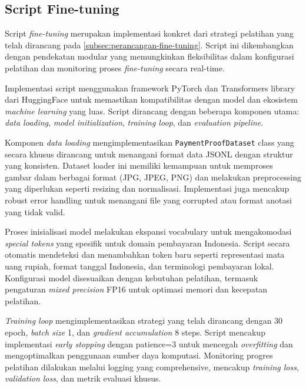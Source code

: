 \subsection{Script Fine-tuning}
\label{subsec:script-fine-tuning}

Script \emph{fine-tuning} merupakan implementasi konkret dari strategi pelatihan yang telah dirancang pada \autoref{subsec:perancangan-fine-tuning}. Script ini dikembangkan dengan pendekatan modular yang memungkinkan fleksibilitas dalam konfigurasi pelatihan dan monitoring proses \emph{fine-tuning} secara real-time.


Implementasi script menggunakan framework PyTorch dan Transformers library dari HuggingFace untuk memastikan kompatibilitas dengan model \donut{} dan ekosistem \emph{machine learning} yang luas. Script dirancang dengan beberapa komponen utama: \emph{data loading}, \emph{model initialization}, \emph{training loop}, dan \emph{evaluation pipeline}.

Komponen \emph{data loading} mengimplementasikan \texttt{PaymentProofDataset} class yang secara khusus dirancang untuk menangani format data JSONL dengan struktur yang konsisten. Dataset loader ini memiliki kemampuan untuk memproses gambar dalam berbagai format (JPG, JPEG, PNG) dan melakukan preprocessing yang diperlukan seperti resizing dan normalisasi. Implementasi juga mencakup robust error handling untuk menangani file yang corrupted atau format anotasi yang tidak valid.

Proses inisialisasi model melakukan ekspansi vocabulary untuk mengakomodasi \emph{special tokens} yang spesifik untuk domain pembayaran Indonesia. Script secara otomatis mendeteksi dan menambahkan token baru seperti representasi mata uang rupiah, format tanggal Indonesia, dan terminologi pembayaran lokal. Konfigurasi model disesuaikan dengan kebutuhan pelatihan, termasuk pengaturan \emph{mixed precision} FP16 untuk optimasi memori dan kecepatan pelatihan.

\emph{Training loop} mengimplementasikan strategi yang telah dirancang dengan 30 epoch, \emph{batch size} 1, dan \emph{gradient accumulation} 8 steps. Script mencakup implementasi \emph{early stopping} dengan patience=3 untuk mencegah \emph{overfitting} dan mengoptimalkan penggunaan sumber daya komputasi. Monitoring progres pelatihan dilakukan melalui logging yang comprehensive, mencakup \emph{training loss}, \emph{validation loss}, dan metrik evaluasi khusus.

